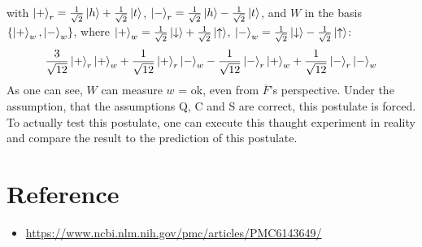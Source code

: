\documentclass[a4paper]{article}
\begin{document}
with $\ket{+}_{r} = \frac{1}{\sqrt{2}} \ket{h} + \frac{1}{\sqrt{2}} \ket{t}$, $\ket{-}_{r} = \frac{1}{\sqrt{2}} \ket{h} - \frac{1}{\sqrt{2}} \ket{t}$,
and $W$ in the basis $\qty{\ket{+}_{w}, \ket{-}_{w}}$,
where $\ket{+}_{w} = \frac{1}{\sqrt{2}} \ket{\downarrow} + \frac{1}{\sqrt{2}} \ket{\uparrow}$, $\ket{-}_{w} = \frac{1}{\sqrt{2}} \ket{\downarrow} - \frac{1}{\sqrt{2}} \ket{\uparrow}$:
\begin{align*}
\frac{3}{\sqrt{12}}\ket{+}_{r}\ket{+}_{w} + \frac{1}{\sqrt{12}}\ket{+}_{r}\ket{-}_{w} - \frac{1}{\sqrt{12}}\ket{-}_{r}\ket{+}_{w} + \frac{1}{\sqrt{12}}\ket{-}_{r}\ket{-}_{w}
\end{align*}
As one can see, $W$ can measure $w$ = ok, even from $\overline{F}$'s perspective.
Under the assumption, that the assumptions Q, C and S are correct, this postulate is forced.
To actually test this postulate, one can execute this thaught experiment in reality and compare the result to the prediction of this postulate.

\section*{Reference}
\begin{itemize}
	\item \url{https://www.ncbi.nlm.nih.gov/pmc/articles/PMC6143649/}
\end{itemize}
\end{document}
